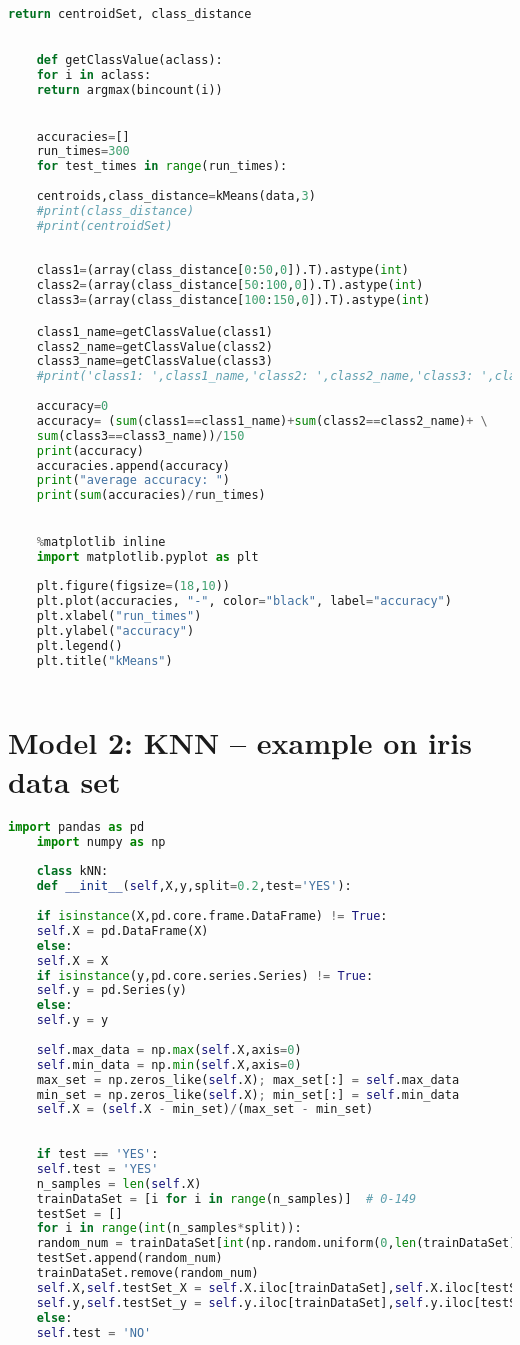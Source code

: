 \begin{appendices}
\begin{lstlisting}[language=python]
	return centroidSet, class_distance
	

	def getClassValue(aclass):
	for i in aclass:
	return argmax(bincount(i))

	
	accuracies=[]
	run_times=300 
	for test_times in range(run_times):
	
	centroids,class_distance=kMeans(data,3)
	#print(class_distance)
	#print(centroidSet)
	
	
	class1=(array(class_distance[0:50,0]).T).astype(int)
	class2=(array(class_distance[50:100,0]).T).astype(int)
	class3=(array(class_distance[100:150,0]).T).astype(int)

	class1_name=getClassValue(class1)
	class2_name=getClassValue(class2) 
	class3_name=getClassValue(class3) 
	#print('class1: ',class1_name,'class2: ',class2_name,'class3: ',class3_name)
	
	accuracy=0
	accuracy= (sum(class1==class1_name)+sum(class2==class2_name)+ \
	sum(class3==class3_name))/150
	print(accuracy)
	accuracies.append(accuracy)
	print("average accuracy: ")
	print(sum(accuracies)/run_times)

	
	%matplotlib inline
	import matplotlib.pyplot as plt
	
	plt.figure(figsize=(18,10))
	plt.plot(accuracies, "-", color="black", label="accuracy")
	plt.xlabel("run_times")
	plt.ylabel("accuracy")
	plt.legend() 
	plt.title("kMeans")
	
	\end{lstlisting}
    \section{Model 2: KNN -- example on iris data set \label{apB}}
    \begin{lstlisting}[language=python]
    import pandas as pd
    import numpy as np
    
    class kNN:
    def __init__(self,X,y,split=0.2,test='YES'):
    
    if isinstance(X,pd.core.frame.DataFrame) != True:  
    self.X = pd.DataFrame(X)
    else:
    self.X = X
    if isinstance(y,pd.core.series.Series) != True:
    self.y = pd.Series(y)
    else:
    self.y = y  
    
    self.max_data = np.max(self.X,axis=0)
    self.min_data = np.min(self.X,axis=0)
    max_set = np.zeros_like(self.X); max_set[:] = self.max_data 
    min_set = np.zeros_like(self.X); min_set[:] = self.min_data
    self.X = (self.X - min_set)/(max_set - min_set)
    
  
    if test == 'YES':     
    self.test = 'YES'   
    n_samples = len(self.X)
    trainDataSet = [i for i in range(n_samples)]  # 0-149
    testSet = []                          
    for i in range(int(n_samples*split)):
    random_num = trainDataSet[int(np.random.uniform(0,len(trainDataSet)))]
    testSet.append(random_num) 
    trainDataSet.remove(random_num)
    self.X,self.testSet_X = self.X.iloc[trainDataSet],self.X.iloc[testSet]
    self.y,self.testSet_y = self.y.iloc[trainDataSet],self.y.iloc[testSet]
    else:
    self.test = 'NO'
    

\end{lstlisting}
\end{appendices}
